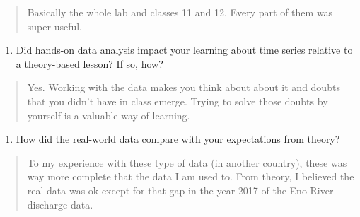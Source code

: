 \documentclass[]{article}
\providecommand{\tightlist}{%
  \setlength{\itemsep}{0pt}\setlength{\parskip}{0pt}}
\begin{document}
\begin{quote}
Basically the whole lab and classes 11 and 12. Every part of them was
super useful.
\end{quote}

\begin{enumerate}
\def\labelenumi{\arabic{enumi}.}
\setcounter{enumi}{16}
\tightlist
\item
  Did hands-on data analysis impact your learning about time series
  relative to a theory-based lesson? If so, how?
\end{enumerate}

\begin{quote}
Yes. Working with the data makes you think about about it and doubts
that you didn't have in class emerge. Trying to solve those doubts by
yourself is a valuable way of learning.
\end{quote}

\begin{enumerate}
\def\labelenumi{\arabic{enumi}.}
\setcounter{enumi}{17}
\tightlist
\item
  How did the real-world data compare with your expectations from
  theory?
\end{enumerate}

\begin{quote}
To my experience with these type of data (in another country), these was
way more complete that the data I am used to. From theory, I believed
the real data was ok except for that gap in the year 2017 of the Eno
River discharge data.
\end{quote}
\end{document}
